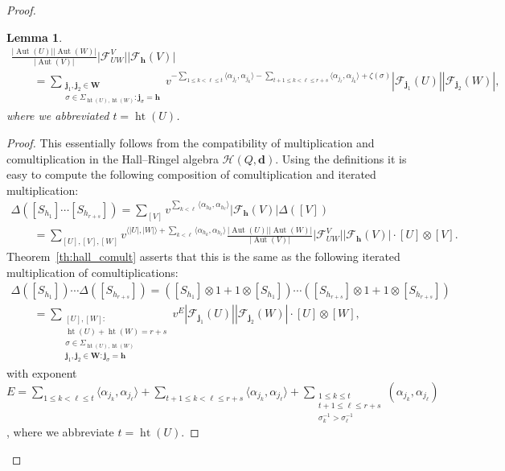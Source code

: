 \documentclass[11pt]{article}
\numberwithin{equation}{section}
\newtheorem{Lemma}[Theorem]{Lemma}
\begin{document}
\begin{proof}
\begin{Lemma}
\begin{gather}
\frac{|\operatorname{Aut}(U)||\operatorname{Aut}(W)|}{|\operatorname{Aut}(V)|}\big|\mathcal{F}^V_{UW}\big||\mathcal{F}_\mathbf{h}(V)|
\\
\qquad
 =\sum\limits_{\substack{\mathbf{j}_1,\mathbf{j}_2\in\mathbf{W}\\
\sigma\in\Sigma_{\operatorname{ht}(U),\operatorname{ht}(W)}: \mathbf{j}_\sigma=\mathbf{h}}}v^{-\sum\limits_{1\le
k<\ell\le t}\langle\alpha_{j_\ell},\alpha_{j_k}\rangle-\sum\limits_{t+1\le k<\ell\le
r+s}\langle\alpha_{j_\ell},\alpha_{j_k}\rangle+\zeta(\sigma)}|\mathcal{F}_{\mathbf{j}_1}(U)||\mathcal{F}_{\mathbf{j}_2}(W)|,
\label{eq:flag_identity}
\end{gather}
where we abbreviated $t=\operatorname{ht}(U)$.
\end{Lemma}

\begin{proof}
This essentially follows from the compatibility of multiplication and comultiplication in the Hall--Ringel algebra
$\mathcal{H}(Q,\mathbf{d})$.
Using the def\/initions it is easy to compute the following composition of comultiplication and iterated multiplication:
\begin{gather*}
\Delta([S_{h_1}]\cdots[S_{h_{r+s}}])=\sum\limits_{[V]}v^{\sum\limits_{k<\ell}\langle
\alpha_{h_k},\alpha_{h_\ell}\rangle}|\mathcal{F}_\mathbf{h}(V)|\Delta([V])
\\
\qquad
 =\sum\limits_{[U],[V],[W]}v^{\langle|U|,|W|\rangle+\sum\limits_{k<\ell}\langle\alpha_{h_k},\alpha_{h_\ell}\rangle}
\frac{|\operatorname{Aut}(U)||\operatorname{Aut}(W)|}{|\operatorname{Aut}(V)|}\big|\mathcal{F}^V_{UW}\big||\mathcal{F}_\mathbf{h}(V)|\cdot[U]\otimes[V].
\end{gather*}
Theorem~\ref{th:hall_comult} asserts that this is the same as the following iterated multiplication of
comultiplications:
\begin{gather*}
\Delta([S_{h_1}])\cdots\Delta([S_{h_{r+s}}])=([S_{h_1}]\otimes1+1\otimes[S_{h_1}])\cdots([S_{h_{r+s}}]\otimes1+1\otimes[S_{h_{r+s}}])
\\
\qquad
 =\sum\limits_{\substack{[U],[W]:\\ \operatorname{ht}(U)+\operatorname{ht}(W)=r+s\\
\sigma\in\Sigma_{\operatorname{ht}(U),\operatorname{ht}(W)}\\
\mathbf{j}_1,\mathbf{j}_2\in\mathbf{W}: \mathbf{j}_\sigma=\mathbf{h}}}v^E
|\mathcal{F}_{\mathbf{j}_1}(U)||\mathcal{F}_{\mathbf{j}_2}(W)|\cdot [U]\otimes[W],
\end{gather*}
with exponent $E=\sum\limits_{1\le k<\ell\le t}\langle\alpha_{j_k},\alpha_{j_\ell}\rangle
+\sum\limits_{t+1\le k<\ell\le r+s}\langle\alpha_{j_k},\alpha_{j_\ell}\rangle
+\sum\limits_{\substack{1\le k\le t\\t+1\le\ell\le r+s\\\sigma_k^{-1}>\sigma_\ell^{-1}}}(\alpha_{j_k},\alpha_{j_\ell})$,
where we abbreviate $t=\operatorname{ht}(U)$.


\end{proof}
\end{proof}
\end{document}
